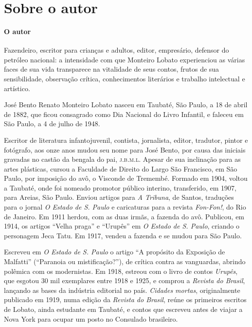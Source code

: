 \documentclass[11pt]{extarticle}
\begin{document}
\section{Sobre o autor}


\paragraph{O autor}
Fazendeiro, escritor para crianças e adultos, editor, empresário,
defensor do petróleo nacional: a intensidade com que Monteiro Lobato
experienciou as várias faces de sua vida transparece na vitalidade de
seus contos, frutos de sua sensibilidade, observação crítica,
conhecimentos literários e trabalho intelectual e artístico.

José Bento Renato Monteiro Lobato nasceu em Taubaté, São Paulo, a 18 de
abril de 1882, que ficou consagrado como Dia Nacional do Livro Infantil,
e faleceu em São Paulo, a 4 de julho de 1948.

Escritor de literatura infantojuvenil, contista, jornalista, editor,
tradutor, pintor e fotógrafo, aos onze anos mudou seu nome para José
Bento, por causa das iniciais gravadas no castão da bengala do pai,
\textsc{j.b.m.l}. Apesar de sua inclinação para as artes plásticas, cursou a
Faculdade de Direito do Largo São Francisco, em São Paulo, por imposição
do avô, o Visconde de Tremembé. Formado em 1904, voltou a Taubaté, onde
foi nomeado promotor público interino, transferido, em 1907, para
Areias, São Paulo. Enviou artigos para \emph{A Tribuna}, de Santos,
traduções para o jornal \emph{O Estado de S. Paulo} e caricaturas para a
revista \emph{Fon-Fon!}, do Rio de Janeiro. Em 1911 herdou, com as duas
irmãs, a fazenda do avô. Publicou, em 1914, os artigos ``Velha praga'' e
``Urupês'' em \emph{O Estado de S. Paulo}, criando o personagem Jeca
Tatu. Em 1917, vendeu a fazenda e se mudou para São Paulo.


Escreveu em \emph{O Estado de S. Paulo} o artigo ``A propósito da
Exposição de Malfatti'' (``Paranoia ou mistificação?''), de crítica
contra as vanguardas, abrindo polêmica com os modernistas. Em 1918,
estreou com o livro de contos \emph{Urupês}, que esgotou 30 mil
exemplares entre 1918 e 1925, e comprou a \emph{Revista do Brasil},
lançando as bases da indústria editorial no país. \emph{Cidades mortas},
originalmente publicado em 1919, numa edição da \emph{Revista do
Brasil}, reúne os primeiros escritos de Lobato, ainda estudante em
Taubaté, e contos que escreveu antes de viajar a Nova York para ocupar
um posto no Consulado brasileiro.
\end{document}
